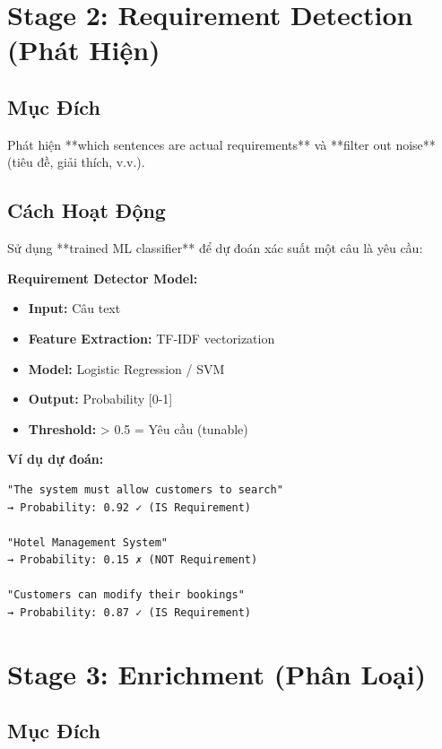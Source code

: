 \documentclass[12pt, a4paper]{report}
\begin{document}
\section{Stage 2: Requirement Detection (Phát Hiện)}

\subsection{Mục Đích}

Phát hiện **which sentences are actual requirements** và **filter out noise** (tiêu đề, giải thích, v.v.).

\subsection{Cách Hoạt Động}

Sử dụng **trained ML classifier** để dự đoán xác suất một câu là yêu cầu:

\begin{tcolorbox}[colback=orange!5]
\textbf{Requirement Detector Model:}
\begin{itemize}
    \item \textbf{Input:} Câu text
    \item \textbf{Feature Extraction:} TF-IDF vectorization
    \item \textbf{Model:} Logistic Regression / SVM
    \item \textbf{Output:} Probability [0-1]
    \item \textbf{Threshold:} > 0.5 = Yêu cầu (tunable)
\end{itemize}

\textbf{Ví dụ dự đoán:}
\begin{lstlisting}
"The system must allow customers to search" 
→ Probability: 0.92 ✓ (IS Requirement)

"Hotel Management System" 
→ Probability: 0.15 ✗ (NOT Requirement)

"Customers can modify their bookings" 
→ Probability: 0.87 ✓ (IS Requirement)
\end{lstlisting}
\end{tcolorbox}

\section{Stage 3: Enrichment (Phân Loại)}

\subsection{Mục Đích}
\end{document}
